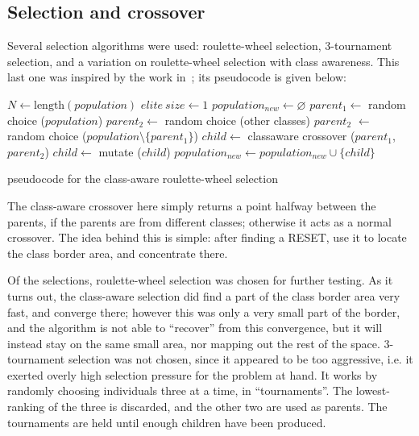 \documentclass[times, utf8, diplomski]{fer}
\begin{document}
\subsection{Selection and crossover}
Several selection algorithms were used: roulette-wheel selection, 3-tournament
selection, and a variation on roulette-wheel selection with class awareness.
This last one was inspired by the work in~\cite{GlitchItIfYouCan}; its
pseudocode is given below:
\begin{algorithm}
    \small
    \begin{algorithmic}
    \STATE $N \gets \text{length}(population)$
    \STATE $elite\ size \gets 1$
    \STATE $population_{new} \gets \varnothing$
        \STATE $parent_1  \gets$ random choice ($population$)
            \STATE $parent_2 \gets$ random choice (other classes)
        \ELSE
            \STATE $parent_2$ $\gets$ random choice ($population \setminus \{parent_1\}$)
        \ENDIF
        \STATE $child \gets$ classaware crossover ($parent_1$, $parent_2$)
        \STATE $child \gets$ mutate ($child$)
        \STATE $population_{new} \gets population_{new} \cup \{child\} $
    \ENDFOR
    \end{algorithmic}
    \caption{pseudocode for the class-aware roulette-wheel selection}
\end{algorithm}

The class-aware crossover here simply returns a point halfway between the parents,
if the parents are from different classes; otherwise it acts as a normal crossover.
The idea behind this is simple: after finding a RESET, use it to locate the class
border area, and concentrate there.

Of the selections, roulette-wheel selection was chosen for further testing.
As it turns out, the class-aware selection did find a part of the class border
area very fast, and converge there; however this was only a very small part of
the border, and the algorithm is not able to ``recover'' from this convergence,
but it will instead stay on the same small area, nor mapping out the rest of
the space.
3-tournament selection was not chosen, since it appeared to be too aggressive,
i.e. it exerted overly high selection pressure for the problem at hand.
It works by randomly choosing individuals three at a time, in ``tournaments''.
The lowest-ranking of the three is discarded, and the other two are used as
parents. The tournaments are held until enough children have been produced.
\end{document}
